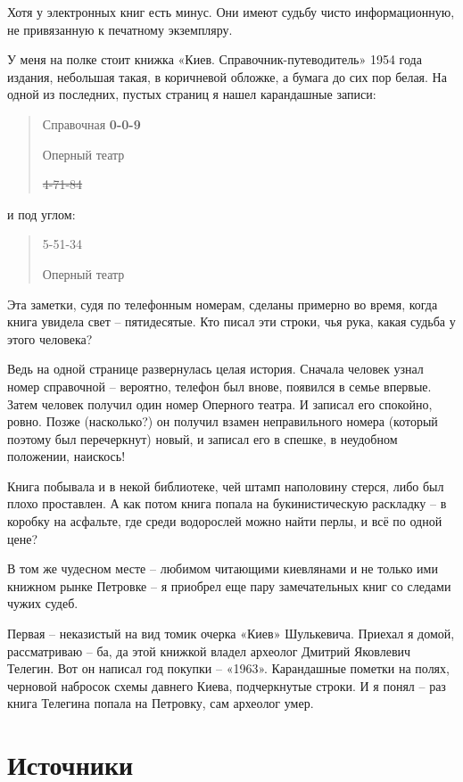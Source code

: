 Хотя у электронных книг есть минус. Они имеют судьбу чисто информационную, не привязанную к печатному экземпляру.

У меня на полке стоит книжка «Киев. Справочник-пут\-еводи\-тель» 1954 года издания, небольшая такая, в коричневой обложке, а бумага до сих пор белая. На одной из последних, пустых страниц я нашел карандашные записи:

\begin{quotation}
Справочная \textbf{0-0-9}

Оперный театр

\sout{4-71-84}
\end{quotation}

и под углом:

\begin{quotation}
5-51-34

Оперный театр
\end{quotation}

Эта заметки, судя по телефонным номерам, сделаны примерно во время, когда книга увидела свет – пятидесятые. Кто писал эти строки, чья рука, какая судьба у этого человека? 

Ведь на одной странице развернулась целая история. Сначала человек узнал номер справочной – вероятно, телефон был внове, появился в семье впервые. Затем человек получил один номер Оперного театра. И записал его спокойно, ровно. Позже (насколько?) он получил взамен неправильного номера (который поэтому был перечеркнут) новый, и записал его в спешке, в неудобном положении, наискось!

Книга побывала и в некой библиотеке, чей штамп наполовину стерся, либо был плохо проставлен. А как потом книга попала на букинистическую раскладку – в коробку на асфальте, где среди водорослей можно найти перлы, и всё по одной цене?

В том же чудесном месте – любимом читающими киевлянами и не только ими книжном рынке Петровке – я приобрел еще пару замечательных книг со следами чужих судеб.

Первая – неказистый на вид томик очерка «Киев» Шулькевича. Приехал я домой, рассматриваю – ба, да  этой книжкой владел археолог Дмитрий Яковлевич Телегин. Вот он написал год покупки – «1963». Карандашные пометки на полях, черновой набросок схемы давнего Киева, подчеркнутые строки. И я понял – раз книга Телегина попала на Петровку, сам археолог умер.


\section*{Источники} 

